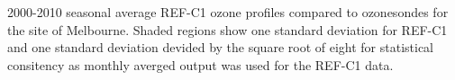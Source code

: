 \label{fig:profile_Melbourne}
2000-2010 seasonal average REF-C1 ozone profiles compared to ozonesondes for the site of Melbourne. Shaded regions show one standard deviation for REF-C1 and one standard deviation devided by the square root of eight for statistical consitency as monthly averged output was used for the REF-C1 data.